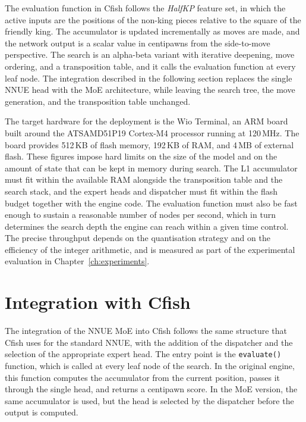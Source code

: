 The evaluation function in Cfish follows the \emph{HalfKP} feature set, in which the active inputs are the positions of the non-king pieces relative to the square of the friendly king. The accumulator is updated incrementally as moves are made, and the network output is a scalar value in centipawns from the side-to-move perspective. The search is an alpha-beta variant with iterative deepening, move ordering, and a transposition table, and it calls the evaluation function at every leaf node. The integration described in the following section replaces the single NNUE head with the MoE architecture, while leaving the search tree, the move generation, and the transposition table unchanged.

The target hardware for the deployment is the Wio Terminal, an ARM board built around the ATSAMD51P19 Cortex-M4 processor running at 120\,MHz. The board provides 512\,KB of flash memory, 192\,KB of RAM, and 4\,MB of external flash. These figures impose hard limits on the size of the model and on the amount of state that can be kept in memory during search. The L1 accumulator must fit within the available RAM alongside the transposition table and the search stack, and the expert heads and dispatcher must fit within the flash budget together with the engine code. The evaluation function must also be fast enough to sustain a reasonable number of nodes per second, which in turn determines the search depth the engine can reach within a given time control. The precise throughput depends on the quantisation strategy and on the efficiency of the integer arithmetic, and is measured as part of the experimental evaluation in Chapter~\ref{ch:experiments}.

\section{Integration with Cfish}\label{sec:cfish}

The integration of the NNUE MoE into Cfish follows the same structure that Cfish uses for the standard NNUE, with the addition of the dispatcher and the selection of the appropriate expert head. The entry point is the \texttt{evaluate()} function, which is called at every leaf node of the search. In the original engine, this function computes the accumulator from the current position, passes it through the single head, and returns a centipawn score. In the MoE version, the same accumulator is used, but the head is selected by the dispatcher before the output is computed.

